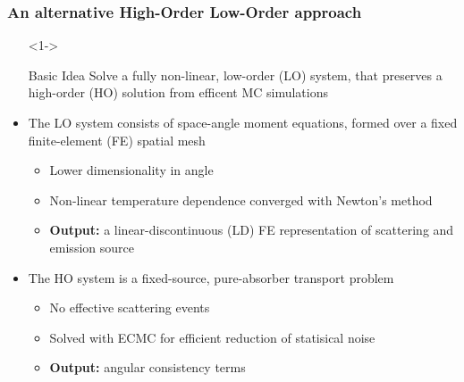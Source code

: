 \documentclass[xcolor=dvipsnames,hyperref={pdfpagelabels=false},unknownkeysallowed]{beamer}
\newcommand{\colb}[1]{{\color{blue} #1}}
\newlength{\wideitemsep}
\let\olditem\item
\renewcommand{\item}{\setlength{\itemsep}{\wideitemsep}\olditem}
\begin{document}
\begin{frame}
    \frametitle{An alternative  High-Order Low-Order approach}
    {\small
        \begin{itemize}
            \item[]<1-> \begin{block}{Basic Idea} Solve a fully non-linear, low-order (LO) system,
                that preserves a high-order (HO) solution from efficent MC simulations \end{block}
                \vspace{-0.321in}
              \item<1-> The LO system consists of space-angle moment equations, formed over a fixed finite-element (FE) spatial mesh
                \begin{itemize}
                    \item<2-> \colb{Lower dimensionality} in angle
              \item<2-> Non-linear temperature dependence converged with Newton's method 
              \item<2-> \textbf{Output:} a linear-discontinuous (LD) FE representation
                        of scattering and emission source
                \end{itemize}
                \vspace{-0.1in}
            \item<3-> The HO system is a fixed-source, pure-absorber transport problem
                \begin{itemize}
                    \item<4-> \colb{No effective scattering} events
                    \item<4-> Solved with ECMC for efficient reduction of statisical noise 
                    \item<4-> \textbf{Output:} angular consistency terms
                \end{itemize}
        \end{itemize}
    }
\end{frame}
\end{document}
